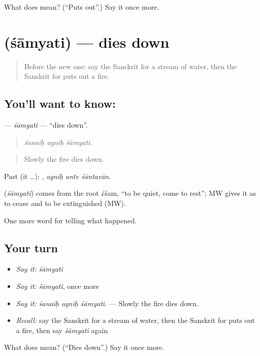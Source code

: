 \begin{tcolorbox}[breakable,colback=teal!4,colframe=teal!35!black,title={Before you move on}]
What does  mean? (\textquotedblleft{}Puts out\textquotedblright{}.) Say it once more.
\end{tcolorbox}
\section[\texorpdfstring{\sk{शाम्यति} (śāmyati)}{शाम्यति (śāmyati)}]{ (śāmyati) — dies down}

\label{lesson:SA-C297-samyati}



\begin{quote}
Before the new one: say the Sanskrit for a stream of water, then the Sanskrit for puts out a fire.
\end{quote}

\subsection*{You'll want to know: }
\textbf{} — \emph{śāmyati} — \textquotedblleft{}dies down\textquotedblright{}.

\begin{quote}
  
\end{quote}

\begin{quote}
\emph{śanaiḥ agniḥ śāmyati.}
\end{quote}

\begin{quote}
Slowly the fire dies down.
\end{quote}

Past (it …):   , \emph{agniḥ ante śāntavān}.

\begin{cousinweb}
\textbf{} (\emph{śāmyati}) comes from the root √śam, \textquotedblleft{}to be quiet, come to rest\textquotedblright{}; MW gives it as to cease and to be extinguished (MW).
\end{cousinweb}

\begin{grammarlens}[title={What you've built}]
One more word for telling what happened.
\end{grammarlens}

\subsection*{Your turn}
\begin{itemize}
\raggedright
  \item \emph{Say it:} \emph{śāmyati}
  \item \emph{Say it:} \emph{śāmyati}, once more
  \item \emph{Say it:} \emph{śanaiḥ agniḥ śāmyati.} — Slowly the fire dies down.
  \item \emph{Recall:} say the Sanskrit for a stream of water, then the Sanskrit for puts out a fire, then say \emph{śāmyati} again
\end{itemize}

\begin{tcolorbox}[breakable,colback=teal!4,colframe=teal!35!black,title={Before you move on}]
What does  mean? (\textquotedblleft{}Dies down\textquotedblright{}.) Say it once more.
\end{tcolorbox}
